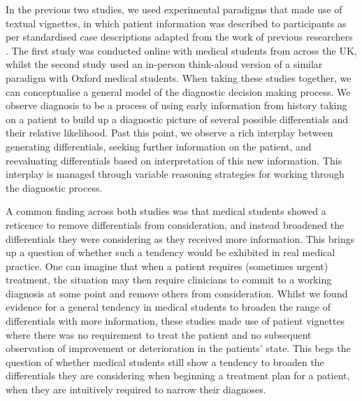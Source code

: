 \documentclass[a4paper, nobind]{templates/ociamthesis}
\begin{document}
In the previous two studies, we used experimental paradigms that made use of textual vignettes, in which patient information was described to participants as per standardised case descriptions adapted from the work of previous researchers \autocite{friedman_physicians_2005}. The first study was conducted online with medical students from across the UK, whilst the second study used an in-person think-aloud version of a similar paradigm with Oxford medical students. When taking these studies together, we can conceptualise a general model of the diagnostic decision making process. We observe diagnosis to be a process of using early information from history taking on a patient to build up a diagnostic picture of several possible differentials and their relative likelihood. Past this point, we observe a rich interplay between generating differentials, seeking further information on the patient, and reevaluating differentials based on interpretation of this new information. This interplay is managed through variable reasoning strategies for working through the diagnostic process.

\hfill\break
A common finding across both studies was that medical students showed a reticence to remove differentials from consideration, and instead broadened the differentials they were considering as they received more information. This brings up a question of whether such a tendency would be exhibited in real medical practice. One can imagine that when a patient requires (sometimes urgent) treatment, the situation may then require clinicians to commit to a working diagnosis at some point and remove others from consideration. Whilst we found evidence for a general tendency in medical students to broaden the range of differentials with more information, these studies made use of patient vignettes where there was no requirement to treat the patient and no subsequent observation of improvement or deterioration in the patients' state. This begs the question of whether medical students still show a tendency to broaden the differentials they are considering when beginning a treatment plan for a patient, when they are intuitively required to narrow their diagnoses.
\end{document}
